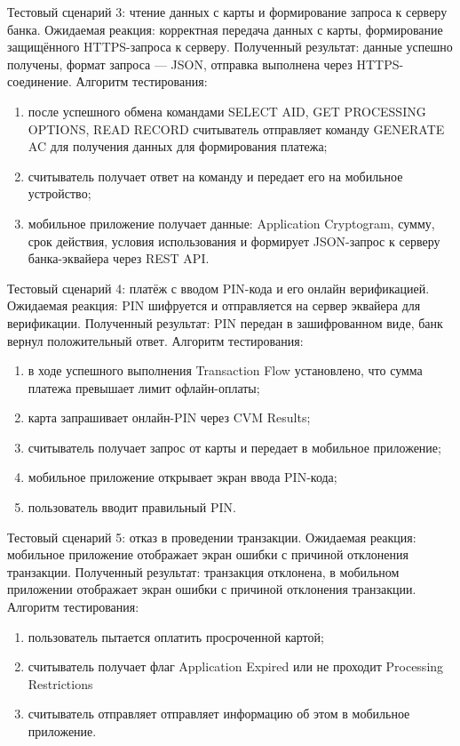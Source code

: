 Тестовый сценарий 3: чтение данных с карты и формирование запроса к серверу банка.
Ожидаемая реакция: корректная передача данных с карты, формирование защищённого HTTPS-запроса к серверу.
Полученный результат: данные успешно получены, формат запроса — JSON, отправка выполнена через HTTPS-соединение.
Алгоритм тестирования:
\begin{enumerate}
	\item после успешного обмена командами SELECT AID, GET PROCESSING OPTIONS, READ RECORD считыватель отправляет команду GENERATE AC для получения данных для формирования платежа;
	\item считыватель получает ответ на команду и передает его на мобильное устройство;
	\item мобильное приложение получает данные: Application Cryptogram, сумму, срок действия, условия использования и формирует JSON-запрос к серверу банка-эквайера через REST API.
\end{enumerate}

Тестовый сценарий 4: платёж с вводом PIN-кода и его онлайн верификацией.
Ожидаемая реакция: PIN шифруется и отправляется на сервер эквайера для верификации.
Полученный результат: PIN передан в зашифрованном виде, банк вернул положительный ответ.
Алгоритм тестирования:
\begin{enumerate}
	\item в ходе успешного выполнения Transaction Flow установлено, что сумма платежа превышает лимит офлайн-оплаты;
	\item карта запрашивает онлайн-PIN через CVM Results;
	\item считыватель получает запрос от карты и передает в мобильное приложение;
	\item мобильное приложение открывает экран ввода PIN-кода;
	\item пользователь вводит правильный PIN.
\end{enumerate}

Тестовый сценарий 5: отказ в проведении транзакции.
Ожидаемая реакция: мобильное приложение отображает экран ошибки с причиной отклонения транзакции.
Полученный результат: транзакция отклонена, в мобильном приложении отображает экран ошибки с причиной отклонения транзакции.
Алгоритм тестирования:
\begin{enumerate}
	\item пользователь пытается оплатить просроченной картой;
	\item считыватель получает флаг Application Expired или не проходит Processing Restrictions
	\item считыватель отправляет отправляет информацию об этом в мобильное приложение.
\end{enumerate}


